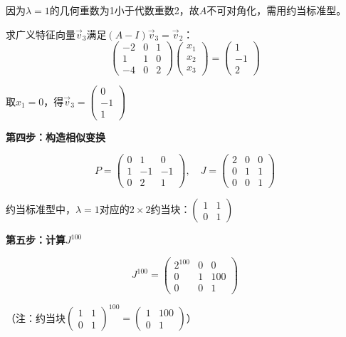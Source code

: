 \documentclass[standard]{ExBook}
\begin{document}
\begin{qitems}
\begin{bbox}
\begin{solution}
            因为$\lambda=1$的几何重数为1小于代数重数2，故$A$不可对角化，需用约当标准型。
            
            求广义特征向量$\vec{v}_3$满足$(A-I)\vec{v}_3 = \vec{v}_2$：
            $$\begin{pmatrix} -2 & 0 & 1 \\ 1 & 1 & 0 \\ -4 & 0 & 2 \end{pmatrix} \begin{pmatrix} x_1 \\ x_2 \\ x_3 \end{pmatrix} = \begin{pmatrix} 1 \\ -1 \\ 2 \end{pmatrix}$$
            
            取$x_1 = 0$，得$\vec{v}_3 = \begin{pmatrix} 0 \\ -1 \\ 1 \end{pmatrix}$
            
            \textbf{第四步：构造相似变换}
            
            $$P = \begin{pmatrix} 0 & 1 & 0 \\ 1 & -1 & -1 \\ 0 & 2 & 1 \end{pmatrix}, \quad J = \begin{pmatrix} 2 & 0 & 0 \\ 0 & 1 & 1 \\ 0 & 0 & 1 \end{pmatrix}$$
            
            约当标准型中，$\lambda=1$对应的$2 \times 2$约当块：$\begin{pmatrix} 1 & 1 \\ 0 & 1 \end{pmatrix}$
            
            \textbf{第五步：计算$J^{100}$}
            
            $$J^{100} = \begin{pmatrix} 2^{100} & 0 & 0 \\ 0 & 1 & 100 \\ 0 & 0 & 1 \end{pmatrix}$$
            
            （注：约当块$\begin{pmatrix} 1 & 1 \\ 0 & 1 \end{pmatrix}^{100} = \begin{pmatrix} 1 & 100 \\ 0 & 1 \end{pmatrix}$）
            

\end{solution}
\end{bbox}
\end{qitems}
\end{document}
